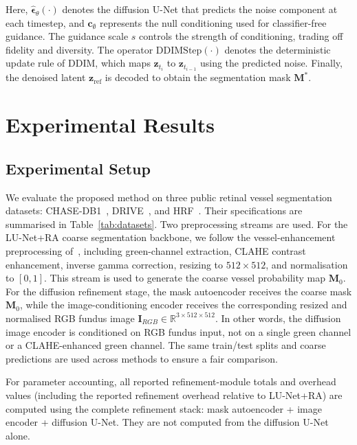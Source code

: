 \documentclass[journal,article,submit,pdftex,moreauthors]{Definitions/mdpi}
\begin{document}
Here, $\hat{\boldsymbol{\epsilon}}_\theta(\cdot)$ denotes the diffusion U-Net that predicts the noise component at each timestep, and $\mathbf{c}_\emptyset$ represents the null conditioning used for classifier-free guidance. The guidance scale $s$ controls the strength of conditioning, trading off fidelity and diversity. The operator $\mathrm{DDIMStep}(\cdot)$ denotes the deterministic update rule of DDIM, which maps $\mathbf{z}_{t_i}$ to $\mathbf{z}_{t_{i-1}}$ using the predicted noise. Finally, the denoised latent $\mathbf{z}_{\mathrm{ref}}$ is decoded to obtain the segmentation mask $\mathbf{M}^*$.

\section{Experimental Results}
\label{sec:experiments_results}

\subsection{Experimental Setup}
We evaluate the proposed method on three public retinal vessel segmentation datasets: CHASE-DB1~\cite{CHASEDB1}, DRIVE~\cite{Staal2004}, and HRF~\cite{Odstrcilik2013HRF}. Their specifications are summarised in Table~\ref{tab:datasets}. Two preprocessing streams are used. For the LU-Net+RA coarse segmentation backbone, we follow the vessel-enhancement preprocessing of~\cite{Hernandez2025}, including green-channel extraction, CLAHE contrast enhancement, inverse gamma correction, resizing to $512\times512$, and normalisation to $[0,1]$. This stream is used to generate the coarse vessel probability map $\mathbf{M}_0$. For the diffusion refinement stage, the mask autoencoder receives the coarse mask $\mathbf{M}_0$, while the image-conditioning encoder receives the corresponding resized and normalised RGB fundus image $\mathbf{I}_{RGB}\in\mathbb{R}^{3\times512\times512}$. In other words, the diffusion image encoder is conditioned on RGB fundus input, not on a single green channel or a CLAHE-enhanced green channel. The same train/test splits and coarse predictions are used across methods to ensure a fair comparison.

For parameter accounting, all reported refinement-module totals and overhead values (including the reported refinement overhead relative to LU-Net+RA) are computed using the complete refinement stack: mask autoencoder + image encoder + diffusion U-Net. They are not computed from the diffusion U-Net alone.
\end{document}

